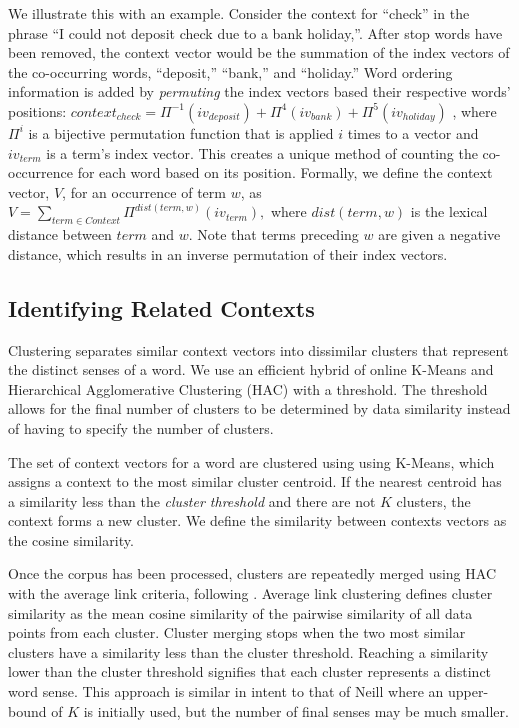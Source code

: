 \documentclass[11pt]{article}
\begin{document}
We illustrate this with an example.  Consider the context for ``check'' in the
phrase ``I could not deposit check due to a bank holiday,''.  After stop words
have been removed, the context vector would be the summation of the index
vectors of the co-occurring words, ``deposit,'' ``bank,'' and ``holiday.''  Word
ordering information is added by \emph{permuting} the index vectors based their
respective words' positions:
%
 {\small $
  context_{check} = \Pi^{-1}(iv_{deposit}) + \Pi^{4}(iv_{bank}) +
  \Pi^{5}(iv_{holiday}) $ },
%
where $\Pi^i$ is a bijective permutation function that is applied $i$ times to a
vector and $iv_{term}$ is a term's index vector.  This creates a unique method
of counting the co-occurrence for each word based on its position.  Formally, we
define the context vector, $V$, for an occurrence of term $w$, as
%
$
V = \sum_{term \in Context} \Pi^{dist(term,w)}(iv_{term}),
$
%
where $dist(term, w)$ is the lexical distance between $term$ and $w$.  Note that
terms preceding $w$ are given a negative distance, which results in an inverse
permutation of their index vectors.


\subsection{Identifying Related Contexts}
\label{sec:clustering}

Clustering separates similar context vectors into dissimilar clusters that
represent the distinct senses of a word.  We use an efficient hybrid of online
K-Means and Hierarchical Agglomerative Clustering (HAC) with a threshold.  The
threshold allows for the final number of clusters to be determined by data
similarity instead of having to specify the number of clusters.

The set of context vectors for a word are clustered using using K-Means, which
assigns a context to the most similar cluster centroid.  If the nearest centroid
has a similarity less than the \emph{cluster threshold} and there are not $K$
clusters, the context forms a new cluster.  We define the similarity between
contexts vectors as the cosine similarity.

Once the corpus has been processed, clusters are repeatedly merged using HAC
with the average link criteria, following \cite{pedersen97distinguishing}.
Average link clustering defines cluster similarity as the mean cosine similarity
of the pairwise similarity of all data points from each cluster.  Cluster
merging stops when the two most similar clusters have a similarity less than the
cluster threshold.  Reaching a similarity lower than the cluster threshold
signifies that each cluster represents a distinct word sense.  This approach is
similar in intent to that of Neill 
where an upper-bound of $K$ is initially used, but the number of final senses
may be much smaller.
\end{document}
